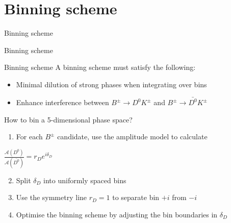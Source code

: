 \documentclass{beamer}
\begin{document}
\section{Binning scheme}
\begin{frame}{Binning scheme}
  \begin{center}
    {\huge Binning scheme}
  \end{center}
\end{frame}

\begin{frame}{Binning scheme}
  \vspace{0.0cm}
  {\Large A binning scheme must satisfy the following:}
  \begin{itemize}
    \item{Minimal dilution of strong phases when integrating over bins}
    \item{Enhance interference between $B^\pm\to D^0K^\pm$ and $B^\pm\to\bar{D^0}K^\pm$}
  \end{itemize}
  \vspace{0.4cm}
  {\Large How to bin a 5-dimensional phase space?}
  \begin{enumerate}
    \item{For each $B^\pm$ candidate, use the amplitude model to calculate}
  \end{enumerate}
  \begin{center}
    {\Large $\frac{\mathcal{A}(D^0)}{\mathcal{A}(\bar{D^0})} = r_De^{i\delta_D}$}
  \end{center}
  \begin{enumerate}
    \setcounter{enumi}{1}
    \setlength\itemsep{0.5em}
    \item{Split $\delta_D$ into uniformly spaced bins}
    \item{Use the symmetry line $r_D = 1$ to separate bin $+i$ from $-i$}
    \item{Optimise the binning scheme by adjusting the bin boundaries in $\delta_D$}
  \end{enumerate}
\end{frame}
\end{document}
